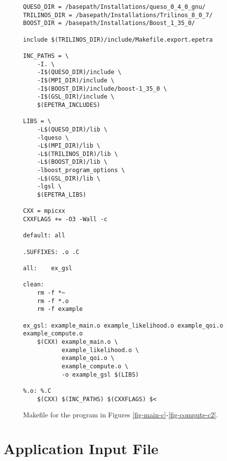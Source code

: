 \begin{figure}[h!]
\begin{center}
\begin{verbatim}
QUESO_DIR = /basepath/Installations/queso_0_4_0_gnu/
TRILINOS_DIR = /basepath/Installations/Trilinos_8_0_7/
BOOST_DIR = /basepath/Installations/Boost_1_35_0/

include $(TRILINOS_DIR)/include/Makefile.export.epetra

INC_PATHS = \
	-I. \
	-I$(QUESO_DIR)/include \
	-I$(MPI_DIR)/include \
	-I$(BOOST_DIR)/include/boost-1_35_0 \
	-I$(GSL_DIR)/include \
	$(EPETRA_INCLUDES)

LIBS = \
	-L$(QUESO_DIR)/lib \
	-lqueso \
	-L$(MPI_DIR)/lib \
	-L$(TRILINOS_DIR)/lib \
	-L$(BOOST_DIR)/lib \
	-lboost_program_options \
	-L$(GSL_DIR)/lib \
	-lgsl \
	$(EPETRA_LIBS)

CXX = mpicxx
CXXFLAGS += -O3 -Wall -c

default: all

.SUFFIXES: .o .C

all:	ex_gsl

clean:
	rm -f *~
	rm -f *.o
	rm -f example

ex_gsl: example_main.o example_likelihood.o example_qoi.o example_compute.o
	$(CXX) example_main.o \
	       example_likelihood.o \
	       example_qoi.o \
	       example_compute.o \
	       -o example_gsl $(LIBS)

%.o: %.C
	$(CXX) $(INC_PATHS) $(CXXFLAGS) $<
\end{verbatim}
\end{center}
\caption{
Makefile for the program in Figures \ref{fig-main-c}-\ref{fig-compute-c2}.
}
\label{fig-make}
\end{figure}

\clearpage
\section{Application Input File}

